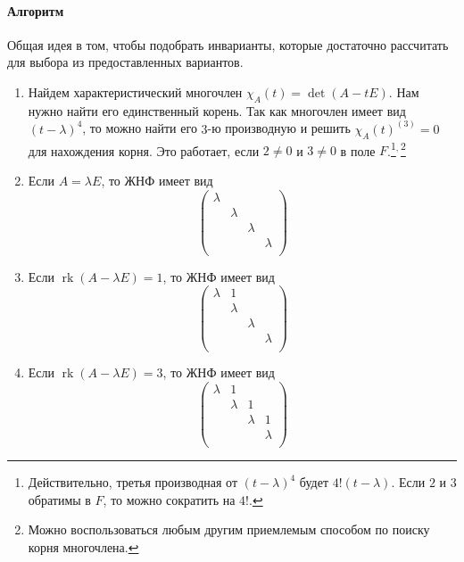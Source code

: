 \documentclass{article}
\newcommand{\rk}{\operatorname{rk}}
\begin{document}
\paragraph{Алгоритм}
Общая идея в том, чтобы подобрать инварианты, которые достаточно рассчитать для выбора из предоставленных вариантов.
\begin{enumerate}
\item Найдем характеристический многочлен $\chi_A(t) = \det(A - t E)$. Нам нужно найти его единственный корень. Так как многочлен имеет вид $(t-\lambda)^4$, то можно найти его $3$-ю производную и решить $\chi_A(t)^{(3)} = 0$ для нахождения корня. Это работает, если $2\neq 0$ и $3\neq 0$ в поле $F$.\footnote{Действительно, третья производная от  $(t-\lambda)^4$ будет $4! (t - \lambda)$. Если $2$ и $3$ обратимы в $F$, то можно сократить на $4!$.}${}^{,\,}$\footnote{Можно воспользоваться любым другим приемлемым способом по поиску корня многочлена.}

\item Если $A = \lambda E$, то ЖНФ имеет вид
\[
\begin{pmatrix}
{\lambda}&{}&{}&{}\\
{}&{\lambda}&{}&{}\\
{}&{}&{\lambda}&{}\\
{}&{}&{}&{\lambda}\\
\end{pmatrix}
\]

\item Если $\rk(A-\lambda E) = 1$, то ЖНФ имеет вид
\[
\begin{pmatrix}
{\lambda}&{1}&{}&{}\\
{}&{\lambda}&{}&{}\\
{}&{}&{\lambda}&{}\\
{}&{}&{}&{\lambda}\\
\end{pmatrix}
\]

\item Если $\rk (A - \lambda E) = 3$, то ЖНФ имеет вид
\[
\begin{pmatrix}
{\lambda}&{1}&{}&{}\\
{}&{\lambda}&{1}&{}\\
{}&{}&{\lambda}&{1}\\
{}&{}&{}&{\lambda}\\
\end{pmatrix}
\]


\end{enumerate}
\end{document}
